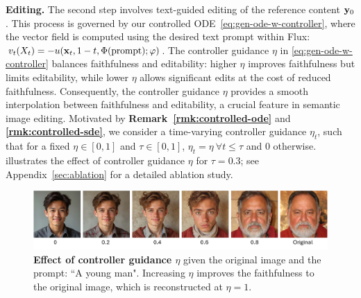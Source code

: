 \documentclass{article} %
\theoremstyle{plain}
\begin{document}
\textbf{Editing.} The second step involves text-guided editing of the reference content ${\mathbf{y}}_0$. This process is governed by our controlled ODE~\eqref{eq:gen-ode-w-controller}, where the vector field is computed using the desired text prompt within Flux: $v_t(X_t)= -u({\mathbf{x}}_t, 1-t,\Phi(\text{prompt});\varphi)$.
The controller guidance $\eta$ in \eqref{eq:gen-ode-w-controller} balances faithfulness and editability: higher $\eta$ improves faithfulness but limits editability, while lower $\eta$ allows significant edits at the cost of reduced faithfulness. Consequently, the controller guidance $\eta$ provides a smooth interpolation between faithfulness and editability, a crucial feature in semantic image editing.
Motivated by \textbf{Remark~\ref{rmk:controlled-ode}} and \textbf{\ref{rmk:controlled-sde}}, we consider a time-varying controller guidance $\eta_t$, such that for a fixed $\eta \in [0,1]$ and $\tau \in [0,1]$, $\eta_t = \eta ~\forall t \leq \tau$ and $0$ otherwise.
 illustrates the effect of controller guidance  $\eta$ for $\tau = 0.3$; see Appendix~\ref{sec:ablation} for a detailed ablation study. 
\vspace{-2ex}



\begin{figure}[!t]
    \vspace{-1ex}
    \includegraphics[width=\linewidth]{pics/ablation-control-strength_low.pdf}
    \vspace{-3ex}
    \caption{
    \textbf{Effect of controller guidance $\eta$} given the original image and the prompt: ``A young man". 
    Increasing $\eta$ improves the faithfulness to the original image, which is reconstructed at $\eta\!=\!1$.
    }
    \label{fig:control-strength}
    \vspace{-2ex}
\end{figure}
\end{document}
